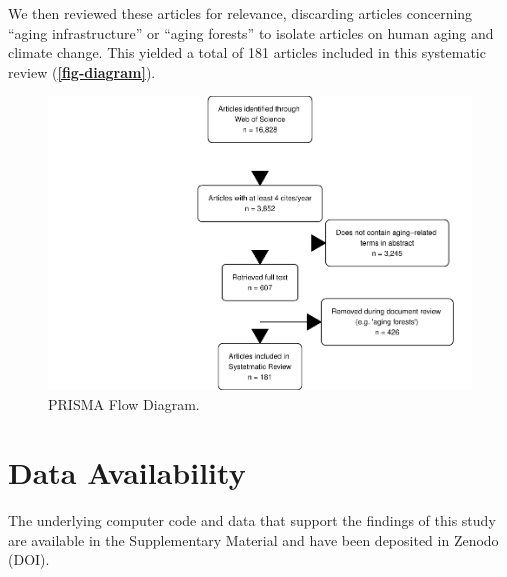 \documentclass[12pt]{article}
\begin{document}
We then reviewed these articles for relevance, discarding articles
concerning ``aging infrastructure'' or ``aging forests'' to isolate
articles on human aging and climate change. This yielded a total of 181
articles included in this systematic review
(\textbf{\autoref{fig-diagram}}).

\begin{figure}
\centering
\includegraphics{MainDocument_files/figure-latex/figureflowdiagram-1.pdf}
\caption{PRISMA Flow Diagram. \label{fig-diagram}}
\end{figure}

\hypertarget{data-availability}{%
\section{Data Availability}\label{data-availability}}

The underlying computer code and data that support the findings of this
study are available in the Supplementary Material and have been
deposited in Zenodo (DOI).



\end{document}
